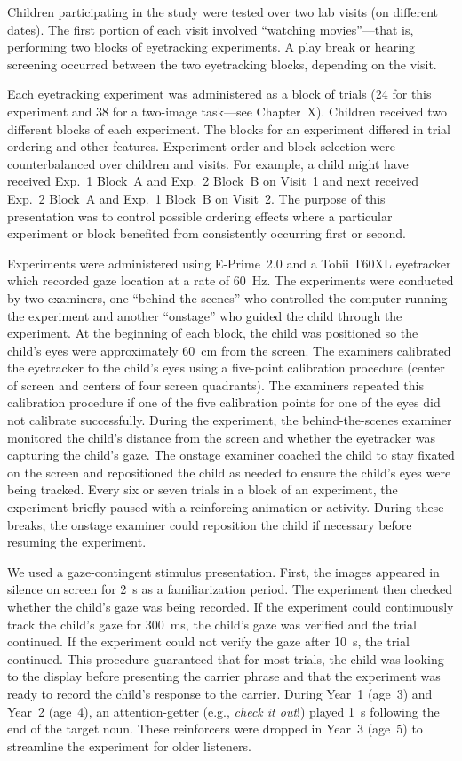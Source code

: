 \documentclass [11pt, proquest] {uwthesis}[2015/03/03]
\begin{document}
Children participating in the study were tested over two lab visits (on
different dates). The first portion of each visit involved ``watching
movies''---that is, performing two blocks of eyetracking experiments. A
play break or hearing screening occurred between the two eyetracking
blocks, depending on the visit.

Each eyetracking experiment was administered as a block of trials (24
for this experiment and 38 for a two-image task---see Chapter~X).
Children received two different blocks of each experiment. The blocks
for an experiment differed in trial ordering and other features.
Experiment order and block selection were counterbalanced over children
and visits. For example, a child might have received Exp.~1 Block~A and
Exp.~2 Block~B on Visit~1 and next received Exp.~2 Block~A and Exp.~1
Block~B on Visit~2. The purpose of this presentation was to control
possible ordering effects where a particular experiment or block
benefited from consistently occurring first or second.

Experiments were administered using E-Prime~2.0 and a Tobii T60XL
eyetracker which recorded gaze location at a rate of 60~Hz. The
experiments were conducted by two examiners, one ``behind the scenes''
who controlled the computer running the experiment and another
``onstage'' who guided the child through the experiment. At the
beginning of each block, the child was positioned so the child's eyes
were approximately 60~cm from the screen. The examiners calibrated the
eyetracker to the child's eyes using a five-point calibration procedure
(center of screen and centers of four screen quadrants). The examiners
repeated this calibration procedure if one of the five calibration
points for one of the eyes did not calibrate successfully. During the
experiment, the behind-the-scenes examiner monitored the child's
distance from the screen and whether the eyetracker was capturing the
child's gaze. The onstage examiner coached the child to stay fixated on
the screen and repositioned the child as needed to ensure the child's
eyes were being tracked. Every six or seven trials in a block of an
experiment, the experiment briefly paused with a reinforcing animation
or activity. During these breaks, the onstage examiner could reposition
the child if necessary before resuming the experiment.

We used a gaze-contingent stimulus presentation. First, the images
appeared in silence on screen for 2~s as a familiarization period. The
experiment then checked whether the child's gaze was being recorded. If
the experiment could continuously track the child's gaze for 300~ms, the
child's gaze was verified and the trial continued. If the experiment
could not verify the gaze after 10~s, the trial continued. This
procedure guaranteed that for most trials, the child was looking to the
display before presenting the carrier phrase and that the experiment was
ready to record the child's response to the carrier. During Year~1
(age~3) and Year~2 (age~4), an attention-getter (e.g., \emph{check it
out}!) played 1~s following the end of the target noun. These
reinforcers were dropped in Year~3 (age~5) to streamline the experiment
for older listeners.
\end{document}
